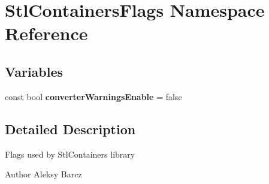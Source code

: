 \hypertarget{namespace_stl_containers_flags}{
\section{StlContainersFlags Namespace Reference}
\label{namespace_stl_containers_flags}
}
\subsection*{Variables}
\begin{DoxyCompactItemize}
\item 
\hypertarget{namespace_stl_containers_flags_a1378dbf72a3fc9f29676cc38470b6d51}{
const bool {\bfseries converterWarningsEnable} = false}
\label{namespace_stl_containers_flags_a1378dbf72a3fc9f29676cc38470b6d51}

\end{DoxyCompactItemize}


\subsection{Detailed Description}
Flags used by StlContainers library

\begin{DoxyAuthor}{Author}
Aleksy Barcz 
\end{DoxyAuthor}
